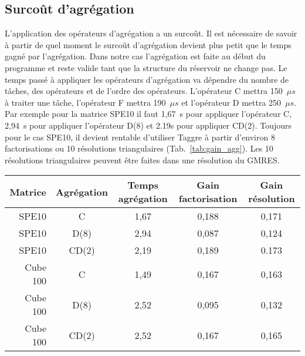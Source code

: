 \subsection{Surcoût d'agrégation}
L'application des opérateurs d'agrégation a un surcoût.
%
Il est nécessaire de savoir à partir de quel moment le surcoût d'agrégation devient plus petit que le temps gagné par l'agrégation.
%
Dans notre cas l'agrégation est faite au début du programme et reste valide tant que la structure du réservoir ne change pas.
%
Le temps passé à appliquer les opérateurs d'agrégation va dépendre du nombre de tâches, des opérateurs et de l'ordre des opérateurs.
%
L'opérateur C mettra 150~$\mu{s}$ à traiter une tâche, l'opérateur F mettra 190~$\mu{s}$ et l'opérateur D mettra 250~$\mu{s}$.
%
Par exemple pour la matrice SPE10 il faut 1,67~s pour appliquer l'opérateur C, 2,94~s pour appliquer l'opérateur D(8) et 2.19s pour appliquer CD(2).
%
Toujours pour le cas SPE10, il devient rentable d'utiliser Taggre à partir d'environ 8 factorisations ou 10 résolutions triangulaires (Tab.~\ref{tab:gain_agg}).
%
Les 10 résolutions triangulaires peuvent être faites dans une résolution du GMRES.
\begin{center}
  \begin{tabular}{ | r | c || c | c | c | }
    \hline
    Matrice & Agrégation & Temps agrégation & Gain factorisation & Gain résolution \\
    \hline
    \hline
    SPE10   &      C     & 1,67          & 0,188          & 0,171 \\
    \hline
    SPE10   &    D(8)    & 2,94          & 0,087          & 0,124 \\
    \hline
    SPE10   &    CD(2)   & 2,19          & 0,189          & 0.173 \\
    \hline
    \hline
    Cube 100&      C     & 1,49          & 0,167          & 0,163 \\
    \hline
    Cube 100&    D(8)    & 2,52          & 0,095          & 0,132 \\
    \hline
    Cube 100&    CD(2)   & 2,52          & 0,167          & 0,165 \\
    \hline
  \end{tabular}
  \label{tab:gain_agg}
\end{center}
